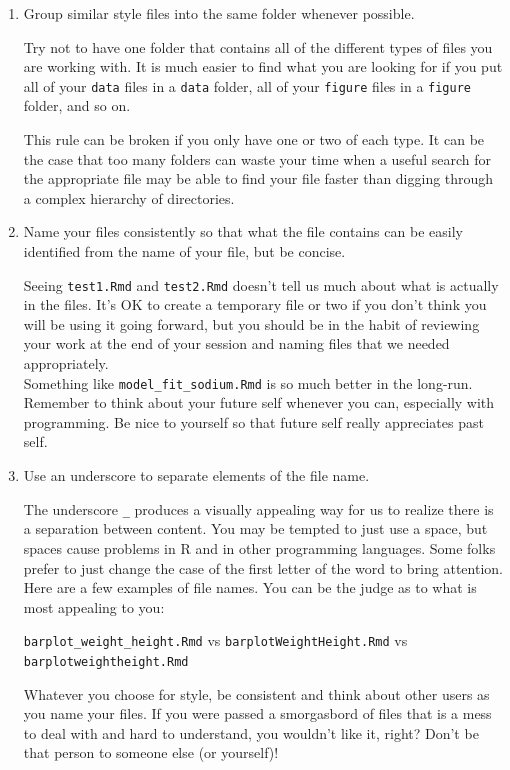 \documentclass[]{tufte-book}
\theoremstyle{definition}
\theoremstyle{definition}
\theoremstyle{remark}
\begin{document}
\begin{enumerate}
\def\labelenumi{\arabic{enumi}.}
\item
  Group similar style files into the same folder whenever possible.

  Try not to have one folder that contains all of the different types of
  files you are working with. It is much easier to find what you are
  looking for if you put all of your \texttt{data} files in a
  \texttt{data} folder, all of your \texttt{figure} files in a
  \texttt{figure} folder, and so on.

  This rule can be broken if you only have one or two of each type. It
  can be the case that too many folders can waste your time when a
  useful search for the appropriate file may be able to find your file
  faster than digging through a complex hierarchy of directories.
\item
  Name your files consistently so that what the file contains can be
  easily identified from the name of your file, but be concise.

  Seeing \texttt{test1.Rmd} and \texttt{test2.Rmd} doesn't tell us much
  about what is actually in the files. It's OK to create a temporary
  file or two if you don't think you will be using it going forward, but
  you should be in the habit of reviewing your work at the end of your
  session and naming files that we needed appropriately.\\
  Something like \texttt{model\_fit\_sodium.Rmd} is so much better in
  the long-run.\\
  Remember to think about your future self whenever you can, especially
  with programming. Be nice to yourself so that future self really
  appreciates past self.
\item
  Use an underscore to separate elements of the file name.

  The underscore \texttt{\_} produces a visually appealing way for us to
  realize there is a separation between content. You may be tempted to
  just use a space, but spaces cause problems in R and in other
  programming languages. Some folks prefer to just change the case of
  the first letter of the word to bring attention. Here are a few
  examples of file names. You can be the judge as to what is most
  appealing to you:

  \texttt{barplot\_weight\_height.Rmd} vs
  \texttt{barplotWeightHeight.Rmd} vs \texttt{barplotweightheight.Rmd}

  Whatever you choose for style, be consistent and think about other
  users as you name your files. If you were passed a smorgasbord of
  files that is a mess to deal with and hard to understand, you wouldn't
  like it, right? Don't be that person to someone else (or yourself)!
\end{enumerate}
\end{document}
